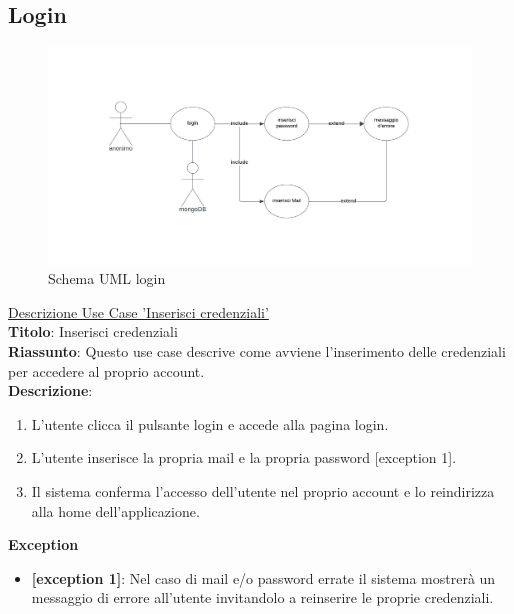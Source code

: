 \documentclass{article}
\begin{document}
    \subsection{Login}
    \begin{figure}[H]
    \centering
    \includegraphics[width=130mm]{D2/Images/loginUML.png}
    \caption{Schema UML login}
\end{figure}

    \noindent\underline{Descrizione Use Case 'Inserisci credenziali'}\\
    \textbf{Titolo}: Inserisci credenziali\\
    \textbf{Riassunto}: Questo use case descrive come avviene l'inserimento delle credenziali per accedere al proprio account.\\
    \textbf{Descrizione}: 
    \begin{enumerate}
        \item L'utente clicca il pulsante login e accede alla pagina login.
        \item L'utente inserisce la propria mail e la propria password [exception 1].
        \item Il sistema conferma l'accesso dell'utente nel proprio account e lo reindirizza alla home dell'applicazione.
    \end{enumerate}
    \textbf{Exception}
    \begin{itemize}
        \item \textbf{[exception 1]}: Nel caso di mail e/o password errate il sistema mostrerà un messaggio di errore all'utente invitandolo a reinserire le proprie credenziali.
    \end{itemize}
    
\end{document}
